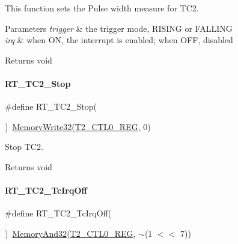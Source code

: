 This function sets the Pulse width measure for T\+C2. 


\begin{DoxyParams}{Parameters}
{\em trigger} & the trigger mode, R\+I\+S\+I\+NG or F\+A\+L\+L\+I\+NG \\
\hline
{\em irq} & when ON, the interrupt is enabled; when O\+FF, disabled \\
\hline
\end{DoxyParams}
\begin{DoxyReturn}{Returns}
void 
\end{DoxyReturn}
\mbox{\label{a00047_a01042ab913ed15f70e6011c57dd9f6a0}} 
\paragraph{\texorpdfstring{R\+T\+\_\+\+T\+C2\+\_\+\+Stop}{RT\_TC2\_Stop}}
{\footnotesize\ttfamily \#define R\+T\+\_\+\+T\+C2\+\_\+\+Stop(\begin{DoxyParamCaption}{ }\end{DoxyParamCaption})~\mbox{\hyperlink{a00020_a6b9732365b12e48ddb89fe1028b975b0}{Memory\+Write32}}(\mbox{\hyperlink{a00020_a5853553391e986211306d4f29ab31e47}{T2\+\_\+\+C\+T\+L0\+\_\+\+R\+EG}}, 0)}



Stop T\+C2. 

\begin{DoxyReturn}{Returns}
void 
\end{DoxyReturn}
\mbox{\label{a00047_a12e287a7ca5033554b5dc4693a231319}} 
\paragraph{\texorpdfstring{R\+T\+\_\+\+T\+C2\+\_\+\+Tc\+Irq\+Off}{RT\_TC2\_TcIrqOff}}
{\footnotesize\ttfamily \#define R\+T\+\_\+\+T\+C2\+\_\+\+Tc\+Irq\+Off(\begin{DoxyParamCaption}{ }\end{DoxyParamCaption})~\mbox{\hyperlink{a00020_ad87cedffcaadc51db22594fce55173d4}{Memory\+And32}}(\mbox{\hyperlink{a00020_a5853553391e986211306d4f29ab31e47}{T2\+\_\+\+C\+T\+L0\+\_\+\+R\+EG}}, $\sim$(1 $<$$<$ 7))}




